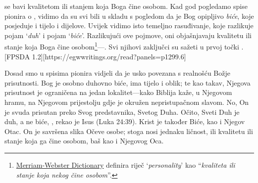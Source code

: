 
 se bavi kvalitetom ili stanjem koja Boga čine osobom. Kad god pogledamo spise pionira o , vidimo da su svi bili u skladu s pogledom da je Bog opipljivo \textit{biće}, koje posjeduje i tijelo i dijelove. Uvijek vidimo isto temeljno rasuđivanje, koje razlikuje pojam ‘\textit{duh}’ i pojam ‘\textit{biće}’. Razlikujući ove pojmove, oni objašnjavaju kvalitetu ili stanje koja Boga čine osobom\footnote{\href{https://www.merriam-webster.com/dictionary/personality}{Merriam-Webster Dictionary} definira riječ ‘\textit{personality}’ kao “\textit{kvaliteta ili stanje koja nekog čine osobom}”.}—. Svi njihovi zaključci su sažeti u prvoj točki . [FPSDA 1.2][https://egwwritings.org/read?panels=p1299.6]

Dosad smo u spisima pionira vidjeli da je  usko povezana s realnošću Božje prisutnosti. Bog je osobno duhovno biće, ima tijelo i oblik; te kao takav, Njegova prisutnost je ograničena na jedan lokalitet—kako Biblija kaže, u Njegovom hramu, na Njegovom prijestolju gdje je okružen nepristupačnom slavom. No, On je svuda prisutan preko Svog predstavnika, Svetog Duha. Očito, Sveti Duh je duh, a ne biće, , rekao je Isus (Luka 24:39). Krist je također Biće, kao i Njegov Otac. On je savršena slika Očeve osobe; stoga nosi jednaku ličnost, ili kvalitetu ili stanje koja ga čine osobom, baš kao i Njegovog Oca.

